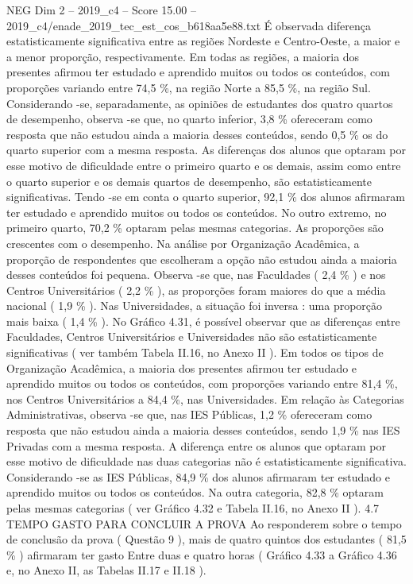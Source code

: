 \begin{textsample}{NEG Dim 2 – 2019\_c4 – Score 15.00 – 2019\_c4/enade\_2019\_tec\_est\_cos\_b618aa5e88.txt}
É observada diferença estatisticamente significativa entre as regiões Nordeste e Centro-Oeste, a maior e a menor proporção, respectivamente.
Em todas as regiões, a maioria dos presentes afirmou ter estudado e aprendido muitos ou todos os conteúdos, com proporções variando entre 74,5 \%, na região Norte a 85,5 \%, na região Sul.
Considerando -se, separadamente, as opiniões de estudantes dos quatro quartos de desempenho, observa -se que, no quarto inferior, 3,8 \% ofereceram como resposta que não estudou ainda a maioria desses conteúdos, sendo 0,5 \% os do quarto superior com a mesma resposta.
As diferenças dos alunos que optaram por esse motivo de dificuldade entre o primeiro quarto e os demais, assim como entre o quarto superior e os demais quartos de desempenho, são estatisticamente significativas.
Tendo -se em conta o quarto superior, 92,1 \% dos alunos afirmaram ter estudado e aprendido muitos ou todos os conteúdos.
No outro extremo, no primeiro quarto, 70,2 \% optaram pelas mesmas categorias.
As proporções são crescentes com o desempenho.
Na análise por Organização Acadêmica, a proporção de respondentes que escolheram a opção não estudou ainda a maioria desses conteúdos foi pequena.
Observa -se que, nas Faculdades ( 2,4 \% ) e nos Centros Universitários ( 2,2 \% ), as proporções foram maiores do que a média nacional ( 1,9 \% ).
Nas Universidades, a situação foi inversa : uma proporção mais baixa ( 1,4 \% ).
No Gráfico 4.31, é possível observar que as diferenças entre Faculdades, Centros Universitários e Universidades não são estatisticamente significativas ( ver também Tabela II.16, no Anexo II ).
Em todos os tipos de Organização Acadêmica, a maioria dos presentes afirmou ter estudado e aprendido muitos ou todos os conteúdos, com proporções variando entre 81,4 \%, nos Centros Universitários a 84,4 \%, nas Universidades.
Em relação às Categorias Administrativas, observa -se que, nas IES Públicas, 1,2 \% ofereceram como resposta que não estudou ainda a maioria desses conteúdos, sendo 1,9 \% nas IES Privadas com a mesma resposta.
A diferença entre os alunos que optaram por esse motivo de dificuldade nas duas categorias não é estatisticamente significativa.
Considerando -se as IES Públicas, 84,9 \% dos alunos afirmaram ter estudado e aprendido muitos ou todos os conteúdos.
Na outra categoria, 82,8 \% optaram pelas mesmas categorias ( ver Gráfico 4.32 e Tabela II.16, no Anexo II ). 4.7 TEMPO GASTO PARA CONCLUIR A PROVA Ao responderem sobre o tempo de conclusão da prova ( Questão 9 ), mais de quatro quintos dos estudantes ( 81,5 \% ) afirmaram ter gasto Entre duas e quatro horas ( Gráfico 4.33 a Gráfico 4.36 e, no Anexo II, as Tabelas II.17 e II.18 ).

\end{textsample}
